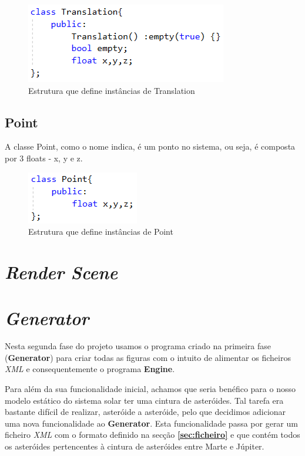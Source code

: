 \documentclass[a4paper]{article}
\begin{document}
\begin{figure}[H]
\centering
\includegraphics[scale=0.8]{translation.png}
\caption{Estrutura que define instâncias de Translation}
\label{img:Tree}
\end{figure}


\subsection{Point}
\label{sec:point}

A classe Point, como o nome indica, é um ponto no sistema, ou seja, é composta por 3 floats - x, y e z.

\begin{figure}[H]
\centering
\includegraphics[scale=0.8]{point.png}
\caption{Estrutura que define instâncias de Point}
\label{img:Point}
\end{figure}


\newpage

\section{\textit{Render Scene}}

\newpage

\section{\textit{Generator}}

Nesta segunda fase do projeto usamos o programa criado na primeira fase (\textbf{Generator}) para criar todas as figuras com o intuito de alimentar os ficheiros \emph{XML} e consequentemente o programa \textbf{Engine}.

Para além da sua funcionalidade inicial, achamos que seria benéfico para o nosso modelo estático do sistema solar ter uma cintura de asteróides. Tal tarefa era bastante difícil de realizar, asteróide a asteróide, pelo que decidimos adicionar uma nova funcionalidade ao \textbf{Generator}. Esta funcionalidade passa por gerar um ficheiro \emph{XML} com o formato definido na secção \textbf{\ref{sec:ficheiro}} e que contém todos os asteróides pertencentes à cintura de asteróides entre Marte e Júpiter.
\end{document}
